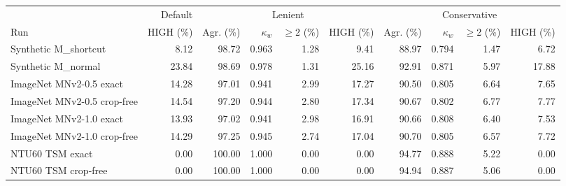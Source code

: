\begin{tabular}{lrrrrrrrrr}
\toprule
 & Default & \multicolumn{4}{c}{Lenient} & \multicolumn{4}{c}{Conservative} \\
\cmidrule(lr){3-6}\cmidrule(lr){7-10}
Run & HIGH (\%) & Agr. (\%) & $\kappa_w$ & $\geq$2 (\%) & HIGH (\%) & Agr. (\%) & $\kappa_w$ & $\geq$2 (\%) & HIGH (\%) \\
\midrule
Synthetic M_shortcut & 8.12 & 98.72 & 0.963 & 1.28 & 9.41 & 88.97 & 0.794 & 1.47 & 6.72 \\
Synthetic M_normal & 23.84 & 98.69 & 0.978 & 1.31 & 25.16 & 92.91 & 0.871 & 5.97 & 17.88 \\
ImageNet MNv2-0.5 exact & 14.28 & 97.01 & 0.941 & 2.99 & 17.27 & 90.50 & 0.805 & 6.64 & 7.65 \\
ImageNet MNv2-0.5 crop-free & 14.54 & 97.20 & 0.944 & 2.80 & 17.34 & 90.67 & 0.802 & 6.77 & 7.77 \\
ImageNet MNv2-1.0 exact & 13.93 & 97.02 & 0.941 & 2.98 & 16.91 & 90.66 & 0.808 & 6.40 & 7.53 \\
ImageNet MNv2-1.0 crop-free & 14.29 & 97.25 & 0.945 & 2.74 & 17.04 & 90.70 & 0.805 & 6.57 & 7.72 \\
NTU60 TSM exact & 0.00 & 100.00 & 1.000 & 0.00 & 0.00 & 94.77 & 0.888 & 5.22 & 0.00 \\
NTU60 TSM crop-free & 0.00 & 100.00 & 1.000 & 0.00 & 0.00 & 94.94 & 0.887 & 5.06 & 0.00 \\
\bottomrule
\end{tabular}
